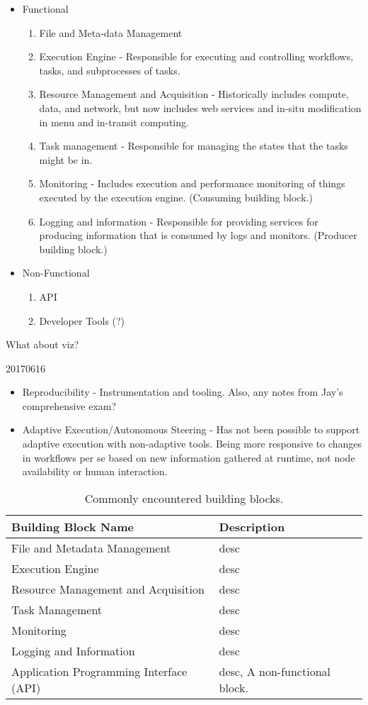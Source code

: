 \begin{itemize}
\item Functional
\begin{enumerate}
\item File and Meta-data Management
\item Execution Engine - Responsible for executing and controlling workflows, tasks, and subprocesses of tasks.
\item Resource Management and Acquisition - Historically includes compute, data, and network, but now includes web services and in-situ modification in menu and in-transit computing.
\item Task management - Responsible for managing the states that the tasks might be in.
\item Monitoring - Includes execution and performance monitoring of things executed by the execution engine. (Consuming building block.)
\item Logging and information - Responsible for providing services for producing information that is consumed by logs and monitors. (Producer building block.)
\end{enumerate}
\item Non-Functional
\begin{enumerate}
\item API 
\item Developer Tools (?)
\end{enumerate}
\end{itemize}

What about viz?

20170616

\begin{itemize}
    \item Reproducibility - Instrumentation and tooling. Also, any notes from Jay's comprehensive exam?
    \item Adaptive Execution/Autonomous Steering - Has not been possible to support adaptive execution with non-adaptive tools. Being more responsive to changes in workflows per se based on new information gathered at runtime, not node availability or human interaction.
\end{itemize}

\begin{table*}[h]
\begin{tabularx}{\textwidth}{|X|X|}
\hline
\textbf{Building Block Name} & \textbf{Description} \tabularnewline\hline
File and Metadata Management & desc
 \tabularnewline\hline 
Execution Engine & desc \tabularnewline\hline
Resource Management and Acquisition & desc \tabularnewline\hline 
Task Management & desc \tabularnewline\hline
Monitoring & desc \tabularnewline\hline 
Logging and Information & desc \tabularnewline\hline
Application Programming Interface (API) & desc, A non-functional block. \tabularnewline\hline
\end{tabularx}
\caption{Commonly encountered building blocks.}
\label{blocks}
\end{table*}

